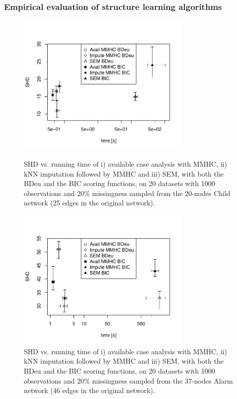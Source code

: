 \documentclass{article}\usepackage[]{graphicx}\usepackage[]{color}
\begin{document}
\subsubsection{Empirical evaluation of structure learning algorithms}
\begin{figure}[!tpb]%
\centerline{\includegraphics[width=0.75\textwidth]{child_crosses_1000.pdf}}
\caption{SHD vs. running time of i) available case analysis with MMHC, ii) kNN imputation followed by MMHC and iii) SEM, with both the BDeu and the BIC scoring functions, on 20 datasets with 1000 observations and $20\%$ missingness sampled from the 20-nodes Child network (25 edges in the original network).}\label{fig:childcrosses}

\centerline{\includegraphics[width=0.75\textwidth]{alarm_crosses_1000.pdf}}
\caption{SHD vs. running time of i) available case analysis with MMHC, ii) kNN imputation followed by MMHC and iii) SEM, with both the BDeu and the BIC scoring functions, on 20 datasets with 1000 observations and $20\%$ missingness sampled from the 37-nodes Alarm network (46 edges in the original network).}\label{fig:alarmcrosses}
\end{figure}
\end{document}
